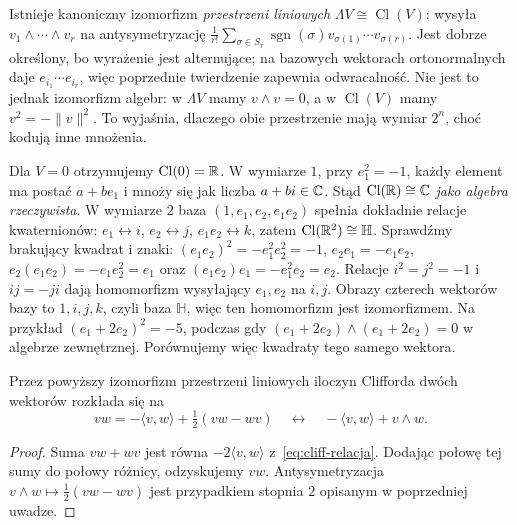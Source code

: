 \begin{uwaga}
\label{rem:cliff-zewnetrzna}
Istnieje kanoniczny izomorfizm \emph{przestrzeni liniowych}
$\Lambda V\cong\operatorname{Cl}(V)$: wysyła
$v_1\wedge\cdots\wedge v_r$ na antysymetryzację
$\frac1{r!}\sum_{\sigma\in S_r}\operatorname{sgn}(\sigma)
 v_{\sigma(1)}\cdots v_{\sigma(r)}$.
Jest dobrze określony, bo wyrażenie jest alternujące;
na bazowych wektorach ortonormalnych daje
$e_{i_1}\cdots e_{i_r}$, więc poprzednie twierdzenie
zapewnia odwracalność. Nie jest to jednak izomorfizm
algebr: w $\Lambda V$ mamy $v\wedge v=0$,
a w $\operatorname{Cl}(V)$ mamy
$v^2=-\|v\|^2$. To wyjaśnia, dlaczego obie
przestrzenie mają wymiar $2^n$, choć kodują
inne mnożenia.
\end{uwaga}

\begin{przyklad}[Wymiary $0$, $1$ i $2$]
Dla $V=0$ otrzymujemy $\operatorname{Cl}(0)=\mathbb{R}$.
W wymiarze $1$, przy $e_1^2=-1$, każdy element
ma postać $a+be_1$ i mnoży się jak liczba
$a+bi\in\mathbb{C}$. Stąd $\operatorname{Cl}(\mathbb{R})\cong\mathbb{C}$
\emph{jako algebra rzeczywista}.
W wymiarze $2$ baza $(1,e_1,e_2,e_1e_2)$
spełnia dokładnie relacje kwaternionów:
$e_1\leftrightarrow i$, $e_2\leftrightarrow j$,
$e_1e_2\leftrightarrow k$, zatem
$\operatorname{Cl}(\mathbb{R}^2)\cong\mathbb H$.
Sprawdźmy brakujący kwadrat i znaki:
$(e_1e_2)^2=-e_1^2e_2^2=-1$,
$e_2e_1=-e_1e_2$,
$e_2(e_1e_2)=-e_1e_2^2=e_1$ oraz
$(e_1e_2)e_1=-e_1^2e_2=e_2$.
Relacje $i^2=j^2=-1$ i $ij=-ji$ dają homomorfizm
wysyłający $e_1,e_2$ na $i,j$.
Obrazy czterech wektorów bazy to $1,i,j,k$, czyli baza
$\mathbb H$, więc ten homomorfizm jest izomorfizmem.
Na przykład $(e_1+2e_2)^2=-5$, podczas gdy
$(e_1+2e_2)\wedge(e_1+2e_2)=0$
w algebrze zewnętrznej. Porównujemy więc kwadraty tego samego wektora.
\end{przyklad}

\begin{stwierdzenie}
\label{prop:cliff-wedge}
Przez powyższy izomorfizm przestrzeni liniowych
iloczyn Clifforda dwóch wektorów rozkłada się na
\begin{equation}\label{eq:cliff-rozdzial}
 vw=-\langle v,w\rangle
       +\tfrac12(vw-wv)
 \quad\longleftrightarrow\quad
 -\langle v,w\rangle+v\wedge w.
\end{equation}
\end{stwierdzenie}
\begin{proof}
Suma $vw+wv$ jest równa
$-2\langle v,w\rangle$ z~\eqref{eq:cliff-relacja}.
Dodając połowę tej sumy do połowy różnicy,
odzyskujemy $vw$. Antysymetryzacja
$v\wedge w\mapsto\tfrac12(vw-wv)$
jest przypadkiem stopnia $2$ opisanym w
poprzedniej uwadze.
\end{proof}

